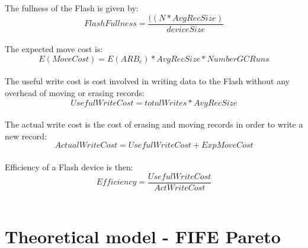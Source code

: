 The fullness of the Flash is given by:
\begin{equation}FlashFullness = \frac{((N * AvgRecSize)}{deviceSize}\end{equation}\\

The expected move cost is:
\begin{equation}E(MoveCost) = E(ARB_c) * AvgRecSize * NumberGCRuns\end{equation}\\

The useful write cost is cost involved in writing data to the Flash without any overhead of moving or erasing records: \begin{equation}UsefulWriteCost = totalWrites * AvgRecSize\end{equation}\\

The actual write cost is the cost of erasing and moving records in order to write a new record:
\begin{equation}ActualWriteCost = UsefulWriteCost + ExpMoveCost\end{equation}\\

Efficiency of a Flash device is then:
\begin{equation}Efficiency = \frac{UsefulWriteCost}{ActWriteCost}\end{equation}\\


\section{Theoretical model - FIFE Pareto}


